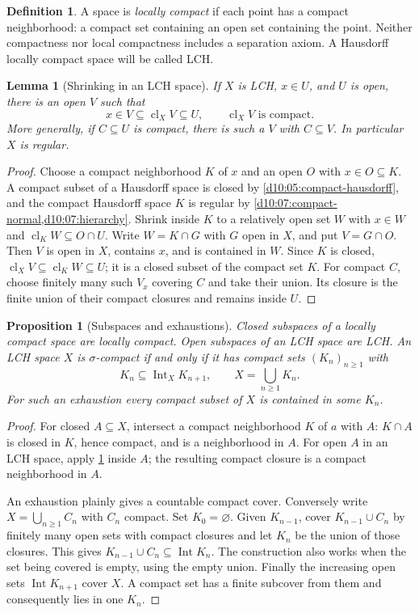 \documentclass[11pt,oneside,openany]{book}
\newtheorem{lemma}[theorem]{Lemma}
\newtheorem{proposition}[theorem]{Proposition}
\theoremstyle{definition}
\newtheorem{definition}[theorem]{Definition}
\theoremstyle{remark}
\DeclareMathOperator{\cl}{cl}
\DeclareMathOperator{\Int}{Int}
\begin{document}
\begin{definition}\label{d10:11:local-compactness}
A space is \emph{locally compact} if each point has a compact neighborhood: a compact set containing an open set containing the point. Neither compactness nor local compactness includes a separation axiom. A Hausdorff locally compact space will be called LCH.
\end{definition}

\begin{lemma}[Shrinking in an LCH space]\label{d10:11:compact-shrinking}
If $X$ is LCH, $x\in U$, and $U$ is open, there is an open $V$ such that
\[
 x\in V\subseteq\cl_X V\subseteq U,\qquad \cl_X V\text{ is compact}.
\]
More generally, if $C\subseteq U$ is compact, there is such a $V$ with $C\subseteq V$. In particular $X$ is regular.
\end{lemma}
\begin{proof}
Choose a compact neighborhood $K$ of $x$ and an open $O$ with $x\in O\subseteq K$. A compact subset of a Hausdorff space is closed by \cref{d10:05:compact-hausdorff}, and the compact Hausdorff space $K$ is regular by \cref{d10:07:compact-normal,d10:07:hierarchy}. Shrink inside $K$ to a relatively open set $W$ with $x\in W$ and $\cl_K W\subseteq O\cap U$. Write $W=K\cap G$ with $G$ open in $X$, and put $V=G\cap O$. Then $V$ is open in $X$, contains $x$, and is contained in $W$. Since $K$ is closed, $\cl_X V\subseteq\cl_K W\subseteq U$; it is a closed subset of the compact set $K$. For compact $C$, choose finitely many such $V_x$ covering $C$ and take their union. Its closure is the finite union of their compact closures and remains inside $U$.
\end{proof}

\begin{proposition}[Subspaces and exhaustions]\label{d10:11:exhaustion}
Closed subspaces of a locally compact space are locally compact. Open subspaces of an LCH space are LCH. An LCH space $X$ is $\sigma$-compact if and only if it has compact sets $(K_n)_{n\geq1}$ with
\[
 K_n\subseteq\Int_X K_{n+1},\qquad X=\bigcup_{n\geq1}K_n.
\]
For such an exhaustion every compact subset of $X$ is contained in some $K_n$.
\end{proposition}
\begin{proof}
For closed $A\subseteq X$, intersect a compact neighborhood $K$ of $a$ with $A$: $K\cap A$ is closed in $K$, hence compact, and is a neighborhood in $A$. For open $A$ in an LCH space, apply \cref{d10:11:compact-shrinking} inside $A$; the resulting compact closure is a compact neighborhood in $A$.

An exhaustion plainly gives a countable compact cover. Conversely write $X=\bigcup_{n\geq1}C_n$ with $C_n$ compact. Set $K_0=\varnothing$. Given $K_{n-1}$, cover $K_{n-1}\cup C_n$ by finitely many open sets with compact closures and let $K_n$ be the union of those closures. This gives $K_{n-1}\cup C_n\subseteq\Int K_n$. The construction also works when the set being covered is empty, using the empty union. Finally the increasing open sets $\Int K_{n+1}$ cover $X$. A compact set has a finite subcover from them and consequently lies in one $K_n$.
\end{proof}
\end{document}
